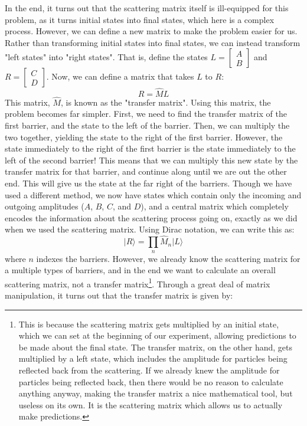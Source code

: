 \documentclass{report}
\begin{document}
In the end, it turns out that the scattering matrix itself is ill-equipped for this problem, as it turns initial states into final states, which here is a complex process. However, we can define a new matrix to make the problem easier for us. Rather than transforming initial states into final states, we can instead transform "left states" into "right states". That is, define the states $L = \begin{bmatrix} A \\ B \end{bmatrix}$ and $R = \begin{bmatrix} C \\ D \end{bmatrix}$. Now, we can define a matrix that takes $L$ to $R$:
\[
R = \hat{M}L
\]
This matrix, $\hat{M}$, is known as the "transfer matrix". Using this matrix, the problem becomes far simpler. First, we need to find the transfer matrix of the first barrier, and the state to the left of the barrier. Then, we can multiply the two together, yielding the state to the right of the first barrier. However, the state immediately to the right of the first barrier is the state immediately to the left of the second barrier! This means that we can multiply this new state by the transfer matrix for that barrier, and continue along until we are out the other end. This will give us the state at the far right of the barriers. Though we have used a different method, we now have states which contain only the incoming and outgoing amplitudes ($A$, $B$, $C$, and $D$), and a central matrix which completely encodes the information about the scattering process going on, exactly as we did when we used the scattering matrix. Using Dirac notation, we can write this as:
\[
\vert R \rangle = \prod_n \hat{M}_n \vert L \rangle
\]
where $n$ indexes the barriers. However, we already know the scattering matrix for a multiple types of barriers, and in the end we want to calculate an overall scattering matrix, not a transfer matrix\footnote{This is because the scattering matrix gets multiplied by an initial state, which we can set at the beginning of our experiment, allowing predictions to be made about the final state. The transfer matrix, on the other hand, gets multiplied by a left state, which includes the amplitude for particles being reflected back from the scattering. If we already knew the amplitude for particles being reflected back, then there would be no reason to calculate anything anyway, making the transfer matrix a nice mathematical tool, but useless on its own. It is the scattering matrix which allows us to actually make predictions.}. Through a great deal of matrix manipulation, it turns out that the transfer matrix is given by:
\end{document}
